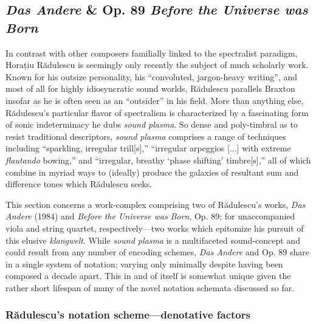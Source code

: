 \subsection{\textit{Das Andere} \& Op. 89 \textit{Before the Universe was Born}}

        In contrast with other composers familially linked to the spectralist paradigm, Horațiu Rădulescu is seemingly only recently the subject of much scholarly work. Known for his outsize personality, his ``convoluted, jargon-heavy writing'', and most of all for highly idiosyncratic sound worlds, Rădulescu parallels Braxton insofar as he is often seen as an ``outsider'' in his field.\autocite{Suckling_2018} More than anything else, Rădulescu's particular flavor of spectralism is characterized by a fascinating form of sonic indeterminacy he dubs \textit{sound plasma}. So dense and poly-timbral as to resist traditional descriptors, \textit{sound plasma} comprises a range of techniques including ``sparkling, irregular trill[s],'' ``irregular arpeggios [...] with extreme \textit{flautando} bowing,'' and ``irregular, breathy `phase shifting' timbre[s],'' all of which combine in myriad ways to (ideally) produce the galaxies of resultant sum and difference tones which Rădulescu seeks.\autocite{Heery_2016}
        
        This section concerns a work-complex comprising two of Rădulescu's works, \textit{Das Andere} (1984) and \textit{Before the Universe was Born}, Op. 89; for unaccompanied viola and string quartet, respectively---two works which epitomize his pursuit of this elusive \textit{klangwelt}. While \textit{sound plasma} is a multifaceted sound-concept and could result from any number of encoding schemes, \textit{Das Andere} and Op. 89 share in a single system of notation; varying only minimally despite having been composed a decade apart. This in and of itself is somewhat unique given the rather short lifespan of many of the novel notation schemata discussed so far.
    
    \subsubsection{Rădulescu's notation scheme---denotative factors}
        
